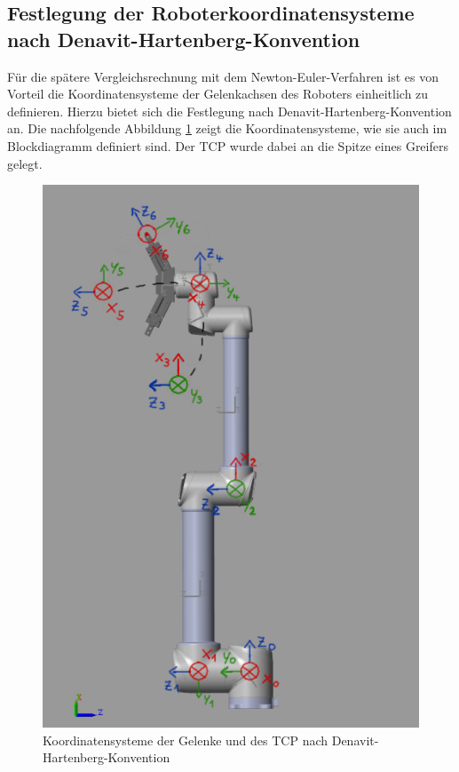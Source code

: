 \newpage

\subsection{Festlegung der Roboterkoordinatensysteme nach Denavit-Hartenberg-Konvention}

Für die spätere Vergleichsrechnung mit dem Newton-Euler-Verfahren ist es von Vorteil die Koordinatensysteme der Gelenkachsen des Roboters einheitlich zu definieren. %
Hierzu bietet sich die Festlegung nach Denavit-Hartenberg-Konvention an.
Die nachfolgende Abbildung \ref{fig:ur10_dh} zeigt die Koordinatensysteme, wie sie auch im Blockdiagramm definiert sind.
Der TCP wurde dabei an die Spitze eines Greifers gelegt.

\begin{figure}[!htbp]
	\centering
	\includegraphics[width=0.5\linewidth]{grafic/UR10_dh}
	\caption{Koordinatensysteme der Gelenke und des TCP nach Denavit-Hartenberg-Konvention}
	\label{fig:ur10_dh}
\end{figure}



